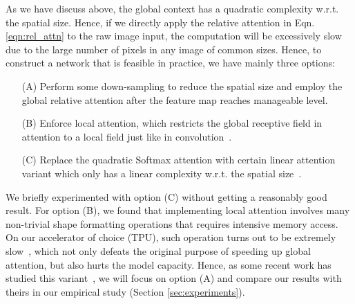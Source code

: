 \documentclass{article}
\begin{document}
As we have discuss above, the global context has a quadratic complexity w.r.t. the spatial size.
Hence, if we directly apply the relative attention in Eqn. \eqref{eqn:rel_attn} to the raw image input, the computation will be excessively slow due to the large number of pixels in any image of common sizes.
Hence, to construct a network that is feasible in practice, we have mainly three options:
\begin{itemize}[leftmargin=2em,itemsep=0pt,topsep=0pt,partopsep=0pt]
\item[(A)] Perform some down-sampling to reduce the spatial size and employ the global relative attention after the feature map reaches manageable level.
\item[(B)] Enforce local attention, which restricts the global receptive field  in attention to a local field  just like in convolution~\cite{liu2021swin,vaswani2021scaling}.
\item[(C)] Replace the quadratic Softmax attention with certain linear attention variant which only has a linear complexity w.r.t. the spatial size~\cite{shen2021efficient,katharopoulos2020transformers,choromanski2020rethinking}.
\end{itemize}
We briefly experimented with option (C) without getting a reasonably good result.
For option (B), we found that implementing local attention involves many non-trivial shape formatting operations that requires intensive memory access. 
On our accelerator of choice (TPU), such operation turns out to be extremely slow~\cite{ramachandran2019stand}, which not only defeats the original purpose of speeding up global attention, but also hurts the model capacity.
Hence, as some recent work has studied this variant~\cite{liu2021swin,vaswani2021scaling}, we will focus on option (A) and compare our results with theirs in our empirical study (Section \ref{sec:experiments}).
\end{document}
